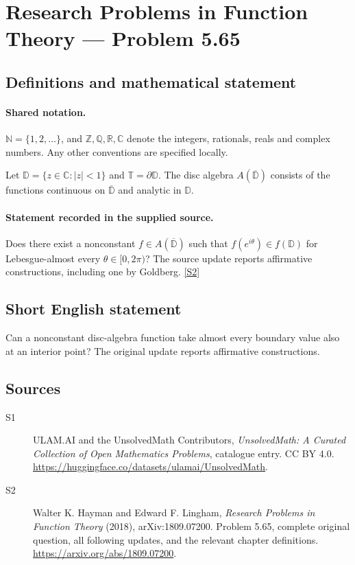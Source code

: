 \documentclass[11pt]{book}
\newcommand{\sref}[2]{\hyperlink{source:#1:#2}{[S#2]}}
\begin{document}
\section{Research Problems in Function Theory — Problem 5.65}\label{statement}

\subsection{Definitions and mathematical statement}

\paragraph{Shared notation.}$\mathbb N=\{1,2,\ldots\}$, and $\mathbb Z,\mathbb Q,\mathbb R,\mathbb C$ denote the integers, rationals, reals and complex numbers. Any other conventions are specified locally.


Let $\mathbb D=\{z\in\mathbb C:|z|<1\}$ and $\mathbb T=\partial\mathbb D$. The disc algebra $A(\overline{\mathbb D})$ consists of the functions continuous on $\overline{\mathbb D}$ and analytic in $\mathbb D$.
\paragraph{Statement recorded in the supplied source.}
Does there exist a nonconstant $f\in A(\overline{\mathbb D})$ such that $f(e^{i\theta})\in f(\mathbb D)$ for Lebesgue-almost every $\theta\in[0,2\pi)$? The source update reports affirmative constructions, including one by Gol\textquotesingle dberg. \sref{statement}{2}
\subsection{Short English statement}
Can a nonconstant disc-algebra function take almost every boundary value also at an interior point? The original update reports affirmative constructions.
\subsection{Sources}
\begin{description}
\item[\hypertarget{source:statement:1}{S1}] ULAM.AI and the UnsolvedMath Contributors, \emph{UnsolvedMath: A Curated Collection of Open Mathematics Problems}, catalogue entry. CC BY 4.0. \url{https://huggingface.co/datasets/ulamai/UnsolvedMath}.
\item[\hypertarget{source:statement:2}{S2}] Walter K. Hayman and Edward F. Lingham, \emph{Research Problems in Function Theory} (2018), arXiv:1809.07200. Problem 5.65, complete original question, all following updates, and the relevant chapter definitions. \url{https://arxiv.org/abs/1809.07200}.
\end{description}
\label{end:statement}
\end{document}
